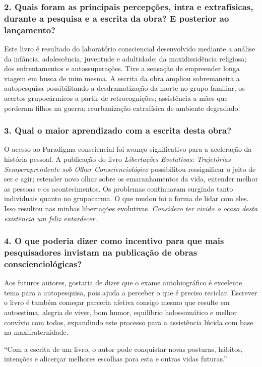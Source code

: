 \documentclass{gescons}
\begin{document}
\begin{multicols}{2}
\subsubsection{2. Quais foram as principais percepções, intra e extrafísicas, durante a pesquisa e a escrita da obra? E posterior ao lançamento?}

Este livro é resultado do laboratório consciencial desenvolvido mediante a análise da infância, adolescência, juventude e adultidade; da maxidissidência religiosa; dos enfrentamentos e autossuperações. Tive a sensação de empreender longa viagem em busca de mim mesma. A escrita da obra ampliou sobremaneira a autopesquisa possibilitando a desdramatização da morte no grupo familiar, os acertos grupocármicos a partir de retrocognições; assistência a mães que perderam filhos na guerra; reurbanização extrafísica de ambiente degradado.


\subsubsection{3. Qual o maior aprendizado com a escrita desta obra?}


O acesso ao Paradigma consciencial foi avanço significativo para a aceleração da história pessoal. A publicação do livro \emph{Libertações Evolutivas: Trajetórias Semperaprendente sob Olhar Conscienciológico} possibilitou ressignificar o jeito de ser e agir; estender novo olhar sobre os emaranhamentos da vida, entender melhor as pessoas e os acontecimentos. Os problemas continuaram surgindo tanto individuais quanto no grupocarma. O que mudou foi a forma de lidar com eles. Isso resultou nas minhas libertações evolutivas. \emph{Considero ter vivido o ocaso desta existência um feliz entardecer.}

\subsubsection{4. O que poderia dizer como incentivo para que mais pesquisadores invistam na publicação de obras conscienciológicas?}

Aos futuros autores, gostaria de dizer que o exame autobiográfico é excelente tema para a autopesquisa, pois ajuda a perceber o que é preciso reciclar. Escrever o livro é também começar parceria afetiva consigo mesmo que resulte em autoestima, alegria de viver, bom humor, equilíbrio holos­somático e melhor convívio com todos, expandindo este processo para a assis­tência lúcida com base na maxifraternidade.


\begin{pullquote}
``Com a escrita de um livro, o autor pode conquistar novas posturas, hábitos, intenções e   alicerçar melhores escolhas para esta e outras vidas futuras.''
\end{pullquote}
    
    \end{multicols}
\end{document}
